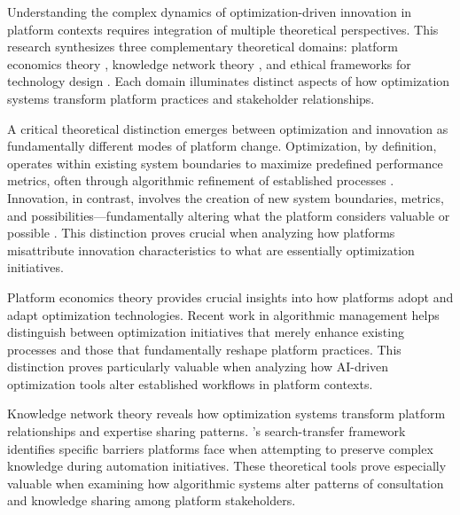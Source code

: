 Understanding the complex dynamics of optimization-driven innovation in platform contexts requires integration of multiple theoretical perspectives. This research synthesizes three complementary theoretical domains: platform economics theory \parencite{parker2016}, knowledge network theory \parencite{hansen1999}, and ethical frameworks for technology design \parencite{friedman2019}. Each domain illuminates distinct aspects of how optimization systems transform platform practices and stakeholder relationships.

A critical theoretical distinction emerges between optimization and innovation as fundamentally different modes of platform change. Optimization, by definition, operates within existing system boundaries to maximize predefined performance metrics, often through algorithmic refinement of established processes \parencite{march1991}. Innovation, in contrast, involves the creation of new system boundaries, metrics, and possibilities---fundamentally altering what the platform considers valuable or possible \parencite{chen2022}. This distinction proves crucial when analyzing how platforms misattribute innovation characteristics to what are essentially optimization initiatives.

Platform economics theory provides crucial insights into how platforms adopt and adapt optimization technologies. Recent work in algorithmic management \parencite{kellogg2020} helps distinguish between optimization initiatives that merely enhance existing processes and those that fundamentally reshape platform practices. This distinction proves particularly valuable when analyzing how AI-driven optimization tools alter established workflows in platform contexts.

Knowledge network theory reveals how optimization systems transform platform relationships and expertise sharing patterns. \textcite{hansen1999}'s search-transfer framework identifies specific barriers platforms face when attempting to preserve complex knowledge during automation initiatives. These theoretical tools prove especially valuable when examining how algorithmic systems alter patterns of consultation and knowledge sharing among platform stakeholders. 